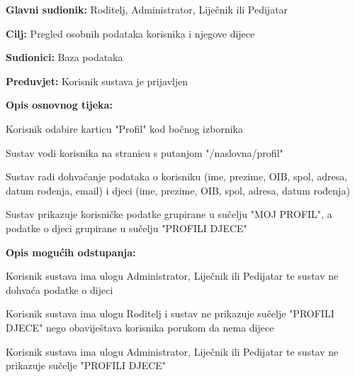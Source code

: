				
				\noindent {}
				\begin{packed_item}
					
					\item \textbf{Glavni sudionik: }Roditelj, Administrator, Liječnik ili Pedijatar
					\item  \textbf{Cilj:} Pregled osobnih podataka korisnika i njegove dijece
					\item  \textbf{Sudionici:} Baza podataka
					\item  \textbf{Preduvjet:} Korisnik sustava je prijavljen
					\item  \textbf{Opis osnovnog tijeka:}
					
					\item[] \begin{packed_enum}
						\item Korisnik odabire karticu "Profil" kod bočnog izbornika
						\item Sustav vodi korisnika na stranicu s putanjom "/naslovna/profil"
						\item Sustav radi dohvaćanje podataka o korisniku (ime, prezime, OIB, spol, adresa, datum rođenja, email) i djeci (ime, prezime, OIB, spol, adresa, datum rođenja)
						\item Sustav prikazuje korisničke podatke grupirane u sučelju "MOJ PROFIL", a podatke o djeci grupirane u sučelju "PROFILI DJECE"
					\end{packed_enum}
					
					\item  \textbf{Opis mogućih odstupanja:}
					
					\item[] \begin{packed_item}
						
						\item[3.a] Korisnik sustava ima ulogu Administrator, Liječnik ili Pedijatar te sustav ne dohvaća podatke o dijeci
						\item[4.a] Korisnik sustava ima ulogu Roditelj i sustav ne prikazuje sučelje "PROFILI DJECE" nego obaviještava korisnika porukom da nema dijece
						\item[4.b] Korisnik sustava ima ulogu Administrator, Liječnik ili Pedijatar te sustav ne prikazuje sučelje "PROFILI DJECE"
					\end{packed_item}
					
				\end{packed_item}
				
